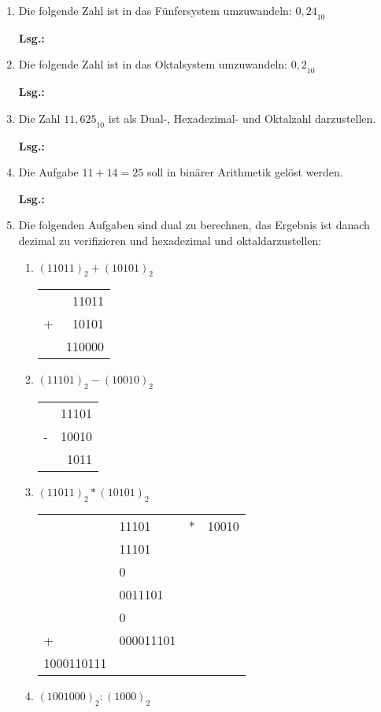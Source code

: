 \documentclass[12pt,a4paper]{scrreprt}
\newcommand{\Lsg}{\par \textbf{Lsg.: \hfill }}
\begin{document}
\begin{enumerate}
\item Die folgende Zahl ist in das Fünfersystem umzuwandeln: ${0,24}_{10}$

\Lsg%

\item Die folgende Zahl ist in das Oktalsystem umzuwandeln: ${0,2}_{10}$

\Lsg%

\item Die Zahl ${11,625}_{10}$ ist als Dual-, Hexadezimal- und Oktalzahl darzustellen.

\Lsg%

\item Die Aufgabe $11+14=25$ soll in binärer Arithmetik gelöst werden.

\Lsg%

\item Die folgenden Aufgaben sind dual zu berechnen, das Ergebnis ist danach dezimal zu verifizieren und hexadezimal und oktaldarzustellen:

\begin{enumerate}
\item $(11011)_2 + (10101)_2$

\begin{tabular}{rr}
 & 11011 \\
+& 10101 \\
\hline
 & 110000
\end{tabular}
\item $(11101)_2 - (10010)_2$

\begin{tabular}{rr}
 & 11101 \\
-& 10010 \\
\hline
 & 1011
\end{tabular}
\item $(11011)_2 * (10101)_2$

\begin{tabular}{llcr}
 & 11101 & * & 10010 \\
 & 11101  \\
 & 0 \\
 & 0011101  \\
 & 0 \\
+& 000011101  \\
\hline 
1000110111
\end{tabular}
\item $(1001000)_2 : (1000)_2$


\end{enumerate}
\end{enumerate}
\end{document}
